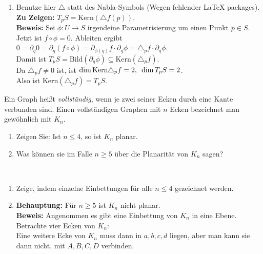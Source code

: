 \begin{solution}
\begin{enumerate}[label= (\alph*)]
    \item Benutze hier \( \triangle \) statt des Nabla-Symbols (Wegen fehlender LaTeX packages). \\
    \textbf{Zu Zeigen:} \( T_p S = \text{Kern}(\triangle f(p)) \). \\
    \textbf{Beweis:} Sei \( \phi: U \to S \) irgendeine Parametrisierung um einen Punkt \( p \in S \). \\
    Jetzt ist \( f \circ \phi = 0 \). Ableiten ergibt \\
    \( 0 = \partial_q 0 = \partial_q (f \circ \phi) = \partial_{\phi(q)}f \cdot \partial_q \phi = \triangle_p f \cdot \partial_q \phi \). \\
    Damit ist \( T_p S = \text{Bild}(\partial_q \phi) \subseteq \text{Kern}(\triangle_p f) \). \\
    Da \( \triangle_p f \neq 0 \) ist, ist \( \dim\text{Kern} \triangle_p f = 2\text{,}\enskip \dim T_p S = 2 \). \\
    Also ist \( \text{Kern}(\triangle_p f) = T_p S \).
  \end{enumerate}
\end{solution}
\begin{assignment}
  Ein Graph heißt \emph{vollständig}, wenn je zwei seiner Ecken durch eine Kante verbunden sind. Einen vollständigen Graphen mit \( n \) Ecken bezeichnet man gewöhnlich mit \( K_n \).
  \begin{enumerate}[label= (\alph*)] 
    \item Zeigen Sie: Ist \( n \leq 4 \), so ist \( K_n \) planar.
    \item Was können sie im Falle \( n \geq 5 \) über die Planarität von \( K_n \) sagen?
  \end{enumerate}
\end{assignment}
\begin{solution}
  \
  \begin{enumerate}[label= (\alph*)] 
    \item Zeige, indem einzelne Einbettungen für alle \( n \leq 4 \) gezeichnet werden. \\
    \item \textbf{Behauptung:} Für \( n \geq 5 \) ist \( K_n \) nicht planar. \\
    \textbf{Beweis:} Angenommen es gibt eine Einbettung von \( K_n \) in eine Ebene. Betrachte vier Ecken von \( K_n \): \\ 
    Eine weitere Ecke von \( K_n \) muss dann in \( a,b,c,d \) liegen, aber man kann sie dann nicht, mit \( A, B, C, D \) verbinden.
  \end{enumerate} 
\end{solution}


